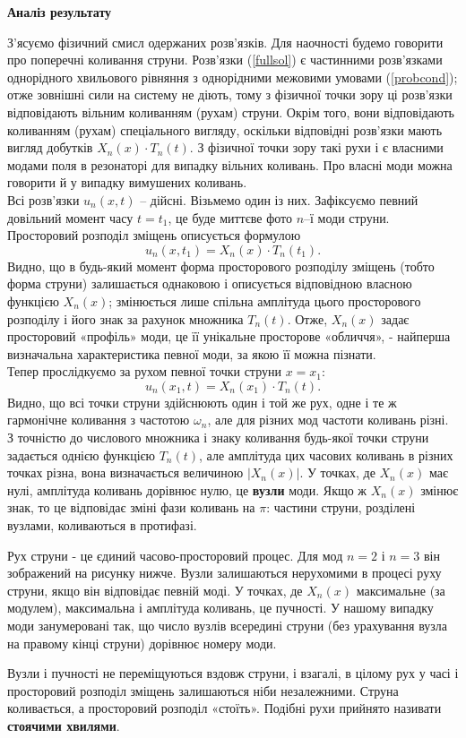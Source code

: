 \documentclass[a4paper, 14pt]{extreport}
\begin{document}
\begin{center}
    \large{\textbf{Аналіз результату}}
\end{center}
З'ясуємо фізичний смисл одержаних розв'язків. Для наочності будемо говорити про поперечні коливання струни. Розв’язки (\ref{fullsol}) є частинними розв'язками однорідного хвильового рівняння з однорідними межовими умовами (\ref{probcond}); отже зовнішні сили на систему не діють, тому з фізичної точки зору ці розв’язки відповідають вільним коливанням (рухам) струни. Окрім того, вони відповідають коливанням (рухам) спеціального вигляду, оскільки відповідні розв’язки мають вигляд добутків $X_n(x) \cdot T_n(t)$. З фізичної точки зору такі рухи і є власними модами поля в резонаторі для випадку вільних коливань. Про власні моди можна говорити й у випадку вимушених коливань.\\
Всі розв’язки $u_n(x, t)$ -- дійсні. Візьмемо один із них. Зафіксуємо певний довільний момент часу $t = t_1$, це буде миттєве фото $n$–ї моди струни. Просторовий розподіл зміщень описується формулою \[u_n(x, t_1) = X_n(x) \cdot T_n(t_1).\] Видно, що в будь-який момент форма просторового розподілу зміщень (тобто форма струни) залишається однаковою і описується відповідною власною функцією $X_n(x)$; змінюється лише спільна амплітуда цього просторового розподілу і його знак за рахунок множника $T_n(t)$. Отже, $X_n(x)$ задає просторовий «профіль» моди, це її унікальне просторове «обличчя», - найперша визначальна характеристика певної моди, за якою її можна пізнати.\\
Тепер прослідкуємо за рухом певної точки струни $x = x_1$: \[u_n(x_1, t) = X_n(x_1) \cdot T_n(t).\] Видно, що всі точки струни здійснюють один і той же рух, одне і те ж гармонічне коливання з частотою $\omega_n$, але для різних мод частоти коливань різні. З точністю до числового множника і знаку коливання будь-якої точки струни задається однією функцією $T_n(t)$, але амплітуда цих часових коливань в різних точках різна, вона визначається величиною $\left|X_n(x)\right|$. У точках, де $X_n(x)$ має нулі, амплітуда коливань дорівнює нулю, це \textbf{вузли} моди. Якщо ж $X_n(x)$ змінює знак, то це відповідає зміні фази коливань на $\pi$: частини струни, розділені вузлами, коливаються в протифазі.

Рух струни - це єдиний часово-просторовий процес. Для мод $n= 2$ і $n= 3$ він зображений на рисунку нижче. Вузли залишаються нерухомими в процесі руху струни, якщо він відповідає певній моді. У точках, де $X_n(x)$ максимальне (за модулем), максимальна і амплітуда коливань, це пучності. У нашому випадку моди занумеровані так, що число вузлів всередині струни (без урахування вузла на правому кінці струни) дорівнює номеру моди.
\begin{center}
    
\end{center}
Вузли і пучності не переміщуються вздовж струни, і взагалі, в цілому рух у часі і просторовий розподіл зміщень залишаються ніби незалежними. Струна коливається, а просторовий розподіл «стоїть». Подібні рухи прийнято називати \textbf{стоячими хвилями}.
\end{document}
